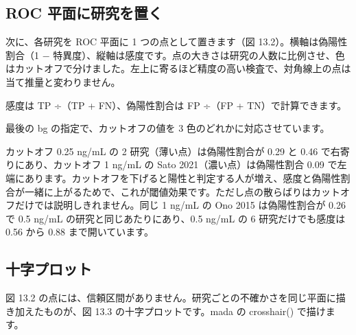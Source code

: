 \subsection{\hatten ROC 平面に研究を置く}
\label{sec:13-1-2}

次に、各研究を ROC 平面に 1 つの点として置きます（図 13.2）。横軸は偽陽性割合（1 − 特異度）、縦軸は感度です。点の大きさは研究の人数に比例させ、色はカットオフで分けました。左上に寄るほど精度の高い検査で、対角線上の点は当て推量と変わりません。


感度は TP ÷（TP + FN）、偽陽性割合は FP ÷（FP + TN）で計算できます。


最後の bg の指定で、カットオフの値を 3 色のどれかに対応させています。

カットオフ 0.25 ng/mL の 2 研究（薄い点）は偽陽性割合が 0.29 と 0.46 で右寄りにあり、カットオフ 1 ng/mL の Sato 2021（濃い点）は偽陽性割合 0.09 で左端にあります。カットオフを下げると陽性と判定する人が増え、感度と偽陽性割合が一緒に上がるためで、これが閾値効果です。ただし点の散らばりはカットオフだけでは説明しきれません。同じ 1 ng/mL の Ono 2015 は偽陽性割合が 0.26 で 0.5 ng/mL の研究と同じあたりにあり、0.5 ng/mL の 6 研究だけでも感度は 0.56 から 0.88 まで開いています。

\subsection{\hatten 十字プロット}
\label{sec:13-1-3}

図 13.2 の点には、信頼区間がありません。研究ごとの不確かさを同じ平面に描き加えたものが、図 13.3 の十字プロットです。mada の crosshair() で描けます。


